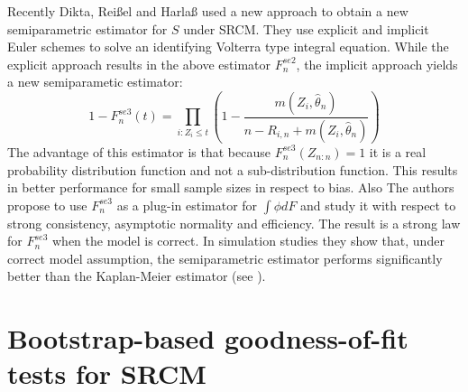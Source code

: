 Recently Dikta, Reißel and Harlaß used a new approach to obtain a new semiparametric estimator for $S$ under SRCM. They use explicit and implicit Euler schemes to solve an identifying Volterra type integral equation. While the explicit approach results in the above estimator $F_n^{se2}$, the implicit approach yields a new semiparametic estimator:
\begin{equation}\label{fnse3}
1-F_n^{se3}(t) = \prod_{i:Z_i \leq t} \left( 1 - \frac{m(Z_i,\hat{\theta}_n)}{n-R_{i,n} + m(Z_i,\hat{\theta}_n)} \right)
\end{equation}
The advantage of this estimator is that because $F_n^{se3}(Z_{n:n}) = 1$ it is a real probability distribution function and not a sub-distribution function. This results in better performance for small sample sizes in respect to bias. Also 
The authors propose to use $F_n^{se3}$ as a plug-in estimator for $\int\phi dF$ and study it with respect to strong consistency, asymptotic normality and efficiency. The result is a strong law for $F_n^{se3}$ when the model is correct. In simulation studies they show that, under correct model assumption, the semiparametric estimator performs significantly better than the Kaplan-Meier estimator (see \cite{PAPER7}).

\section{Bootstrap-based goodness-of-fit tests for SRCM}


